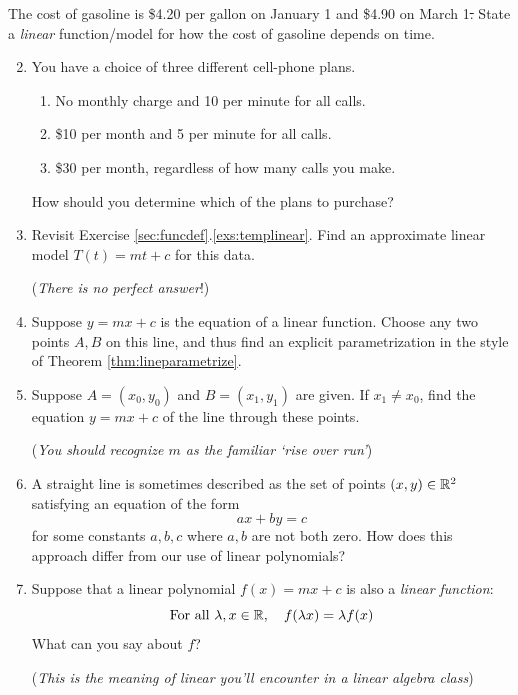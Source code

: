 \bigbreak


\begin{exercises}{}{}
	\exstart The cost of gasoline is \$4.20 per gallon on January 1\st{} and \$4.90 on March 1\st. State a \emph{linear} function/model for how the cost of gasoline depends on time.


	\begin{enumerate}\setcounter{enumi}{1}
	  \item You have a choice of three different cell-phone plans.
	  \begin{enumerate}
	    \item No monthly charge and 10\textcent{} per minute for all calls.
	    \item \$10 per month and 5\textcent{} per minute for all calls.
	    \item \$30 per month, regardless of how many calls you make.
	  \end{enumerate}
	  How should you determine which of the plans to purchase?
	  
	  
	  \item Revisit Exercise \ref*{sec:funcdef}.\ref{exs:templinear}. Find an approximate linear model $T(t)=mt+c$ for this data.\par
	  (\emph{There is no perfect answer}!)
    
    
    \item Suppose $y=mx+c$ is the equation of a linear function. Choose any two points $A,B$ on this line, and thus find an explicit parametrization in the style of Theorem \ref{thm:lineparametrize}.
    
    \item\label{exs:lineparam} Suppose $A=(x_0,y_0)$ and $B=(x_1,y_1)$ are given. If $x_1\neq x_0$, find the equation $y=mx+c$ of the line through these points.
    \par
    (\emph{You should recognize $m$ as the familiar `rise over run'})
    
    
    \item A straight line is sometimes described as the set of points $(x,y)\in\mathbb{R}^2$ satisfying an equation of the form
    \[
    	ax+by=c
    \]
    for some constants $a,b,c$ where $a,b$ are not both zero. How does this approach differ from our use of linear polynomials?
    
    
    \item Suppose that a linear polynomial $f(x)=mx+c$ is also a \emph{linear function}:
    \[
    	\text{For all }\lambda,x\in\mathbb{R},\quad f(\lambda x)=\lambda f(x)
    \]
    What can you say about $f$?\par
    (\emph{This is the meaning of \emph{linear} you'll encounter in a linear algebra class})
   
  \end{enumerate}
\end{exercises}



